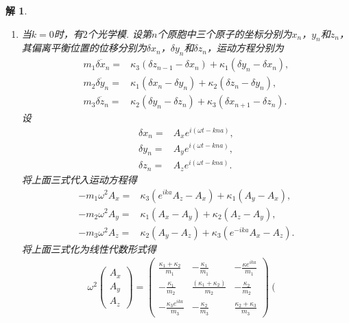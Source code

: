 \documentclass[UTF8,10pt,a4paper]{article}
\theoremstyle{Problem}
\theoremstyle{Solution}
\newtheorem*{sol}{解}
\begin{document}
\begin{sol}
    \begin{enumerate}
        \item[(a)] 当$k=0$时，有$2$个光学模. 设第$n$个原胞中三个原子的坐标分别为$x_n$，$y_n$和$z_n$，其偏离平衡位置的位移分别为$\delta x_n$，$\delta y_n$和$\delta z_n$，运动方程分别为
        \begin{align}
            m_1\ddot{\delta x_n}=&\kappa_3(\delta z_{n-1}-\delta x_n)+\kappa_1(\delta y_n-\delta x_n),\\
            m_2\ddot{\delta y_n}=&\kappa_1(\delta x_n-\delta y_n)+\kappa_2(\delta z_n-\delta y_n),\\
            m_3\ddot{\delta z_n}=&\kappa_2(\delta y_n-\delta z_n)+\kappa_3(\delta x_{n+1}-\delta z_n).
        \end{align}
        设
        \begin{align}
            \delta x_n=&A_xe^{i(\omega t-kna)},\\
            \delta y_n=&A_ye^{i(\omega t-kna)},\\
            \delta z_n=&A_ze^{i(\omega t-kna)}.
        \end{align}
        将上面三式代入运动方程得
        \begin{align}
            -m_1\omega^2A_x=&\kappa_3(e^{ika}A_z-A_x)+\kappa_1(A_y-A_x),\\
            -m_2\omega^2A_y=&\kappa_1(A_x-A_y)+\kappa_2(A_z-A_y),\\
            -m_3\omega^2A_z=&\kappa_2(A_y-A_z)+\kappa_3(e^{-ika}A_x-A_z).
        \end{align}
        将上面三式化为线性代数形式得
        \begin{align}
            \omega^2\left(\begin{matrix}
                A_x\\
                A_y\\
                A_z
            \end{matrix}\right)=\left(\begin{matrix}
                \frac{\kappa_1+\kappa_2}{m_1}&-\frac{\kappa_1}{m_1}&-\frac{\kappa e^{ika}}{m_1}\\
                -\frac{\kappa_1}{m_2}&\frac{(\kappa_1+\kappa_2)}{m_2}&-\frac{\kappa_2}{m_2}\\
                -\frac{\kappa_3e^{ika}}{m_3}&-\frac{\kappa_2}{m_3}&\frac{\kappa_2+\kappa_3}{m_3}
            \end{matrix}\right)\left(\begin{matrix}

\end{matrix}
\end{align}
\end{enumerate}
\end{sol}
\end{document}
